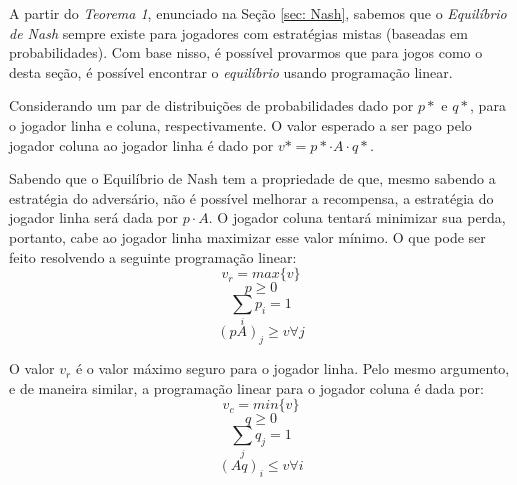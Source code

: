 \documentclass[twoside,conference,a4paper]{IEEEtran}
\begin{document}
            A partir do \emph{Teorema 1}, enunciado na Seção \ref{sec: Nash}, sabemos que o \emph{Equilíbrio de Nash} sempre existe para jogadores com estratégias mistas (baseadas em probabilidades). Com base nisso, é possível provarmos que para jogos como o desta seção, é possível encontrar o \emph{equilíbrio} usando programação linear.
            
            Considerando um par de distribuições de probabilidades dado por $p*$ e $q*$, para o jogador linha e coluna, respectivamente. O valor esperado a ser pago pelo jogador coluna ao jogador linha é dado por $v* = p* \cdot A \cdot q*$. 
            
            Sabendo que o Equilíbrio de Nash tem a propriedade de que, mesmo sabendo a estratégia do adversário, não é possível melhorar a recompensa, a estratégia do jogador linha será dada por $p \cdot A$. O jogador coluna tentará minimizar sua perda, portanto, cabe ao jogador linha maximizar esse valor mínimo. O que pode ser feito resolvendo a seguinte programação linear:
            \begin{equation*}
                v_r = max \{v\}
            \end{equation*}
            \begin{equation*}
                p \geq 0
            \end{equation*}
            \begin{equation*}
                \sum_{i} p_i = 1
            \end{equation*}
            \begin{equation*}
                (pA)_j \geq v \forall j
            \end{equation*}
            
            O valor $v_r$ é o valor máximo seguro para o jogador linha. Pelo mesmo argumento, e de maneira similar, a programação linear para o jogador coluna é dada por:
            \begin{equation*}
                v_c = min \{v\}
            \end{equation*}
            \begin{equation*}
                q \geq 0
            \end{equation*}
            \begin{equation*}
                \sum_{j} q_j = 1
            \end{equation*}
            \begin{equation*}
                (Aq)_i \leq v \forall i
            \end{equation*}
            
\end{document}
